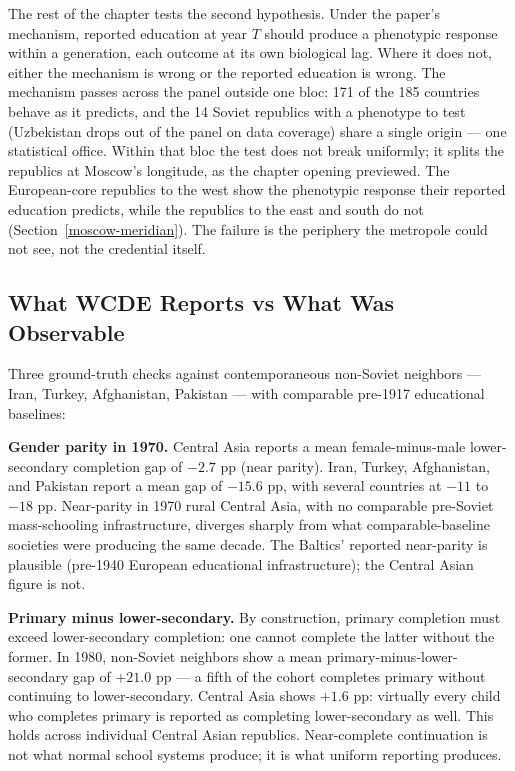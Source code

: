 \documentclass[12pt,letterpaper]{article}
\begin{document}
The rest of the chapter tests the second hypothesis. Under the
paper's mechanism, reported education at year $T$ should produce a
phenotypic response within a generation, each outcome at its own
biological lag. Where it does not, either the
mechanism is wrong or the reported education is wrong. The mechanism
passes across the panel outside one bloc: 171 of the 185 countries
behave as it predicts, and the 14 Soviet republics with a phenotype to
test (Uzbekistan drops out of the panel on data coverage) share a
single origin --- one statistical office. Within that bloc the test
does not break uniformly; it splits the republics at Moscow's
longitude, as the chapter opening previewed. The European-core
republics to the west show the phenotypic response their reported
education predicts, while the republics to the east and south do not
(Section~\ref{moscow-meridian}). The failure is the periphery the
metropole could not see, not the credential itself.

\subsection{What WCDE Reports vs What Was Observable}\label{what-wcde-reports}

Three ground-truth checks against contemporaneous non-Soviet
neighbors --- Iran, Turkey, Afghanistan, Pakistan --- with comparable
pre-1917 educational baselines:

\textbf{Gender parity in 1970.} Central Asia reports a mean
female-minus-male lower-secondary completion gap of $-2.7$ pp (near
parity). Iran, Turkey, Afghanistan, and Pakistan report a mean gap
of $-15.6$ pp, with several countries at $-11$ to $-18$ pp.
Near-parity in 1970 rural Central Asia, with no comparable
pre-Soviet mass-schooling infrastructure, diverges sharply from
what comparable-baseline societies were producing the same decade. The
Baltics' reported near-parity is plausible (pre-1940 European
educational infrastructure); the Central Asian figure is not.

\textbf{Primary minus lower-secondary.} By construction, primary
completion must exceed lower-secondary completion: one cannot
complete the latter without the former. In 1980, non-Soviet neighbors
show a mean primary-minus-lower-secondary gap of $+21.0$ pp --- a fifth of the
cohort completes primary without continuing to lower-secondary.
Central Asia shows $+1.6$ pp: virtually every child who completes
primary is reported as completing lower-secondary as well. This
holds across individual Central Asian republics. Near-complete
continuation is not what normal school systems produce; it is what
uniform reporting produces.
\end{document}

